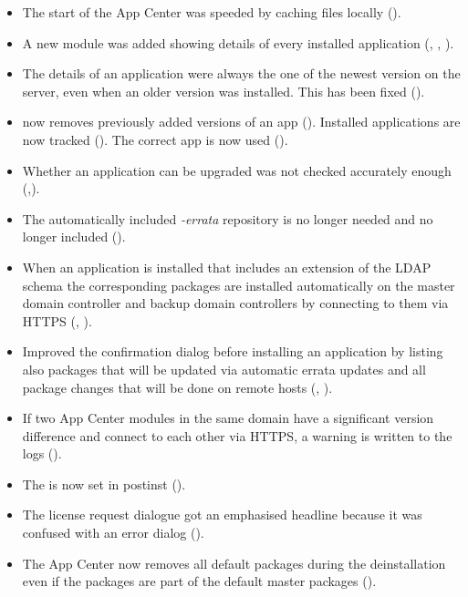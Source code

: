 \begin{itemize}
\item The start of the App Center was speeded by caching files locally ().
\item A new module was added showing details of every installed application
  (, , ).
\item The details of an application were always the one of the newest version
  on the server, even when an older version was installed. This has been fixed
  ().
\item {} now removes previously added versions of an app
  (). Installed applications are now tracked ().
  The correct app is now used ().
\item Whether an application can be upgraded was not checked accurately enough
  (,).
\item The automatically included \emph{-errata} repository is no longer needed
  and no longer included ().
\item When an application is installed that includes an extension of the LDAP
  schema the corresponding packages are installed automatically on the 
  master domain controller and backup domain controllers by connecting
  to them via HTTPS (, ).
\item Improved the confirmation dialog before installing an application by listing also
  packages that will be updated via automatic errata updates and all package
  changes that will be done on remote hosts (, ).
\item If two App Center modules in the same domain have a significant
  version difference and connect to each other via HTTPS, a warning is written to the logs
  ().
\item The  is now set in postinst ().
\item The license request dialogue got an emphasised headline because it was
  confused with an error dialog ().
\item The App Center now removes all default packages during the deinstallation
 even if the packages are part of the default master packages ().

\end{itemize}

